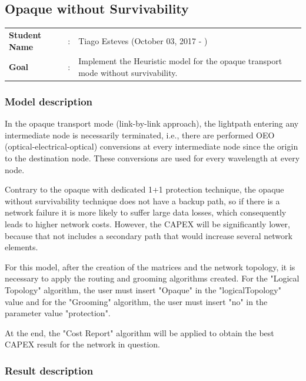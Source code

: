 \clearpage

\subsection{Opaque without Survivability}\label{heuristic_Opaque_Survivability}
\begin{tcolorbox}	
\begin{tabular}{p{2.75cm} p{0.2cm} p{10.5cm}} 	
\textbf{Student Name}  &:& Tiago Esteves    (October 03, 2017 - )\\
\textbf{Goal}          &:& Implement the Heuristic model for the opaque transport mode without survivability.
\end{tabular}
\end{tcolorbox}

\subsubsection{Model description}

In the opaque transport mode (link-by-link approach), the lightpath entering any intermediate node is necessarily terminated, i.e., there are performed OEO (optical-electrical-optical) conversions at every intermediate node since the origin to the destination node. These conversions are used for every wavelength at every node.

Contrary to the opaque with dedicated 1+1 protection technique, the opaque without survivability technique does not have a backup path, so if there is a network failure it is more likely to suffer large data losses, which consequently leads to higher network costs. However, the CAPEX will be significantly lower, because that not includes a secondary path that would increase several network elements.

For this model, after the creation of the matrices and the network topology, it is necessary to apply the routing and grooming algorithms created. For the "Logical Topology" algorithm, the user must insert "Opaque" in the "logicalTopology" value and for the "Grooming" algorithm, the user must insert "no" in the parameter value "protection".

At the end, the "Cost Report" algorithm will be applied to obtain the best CAPEX result for the network in question.

\subsubsection{Result description}

